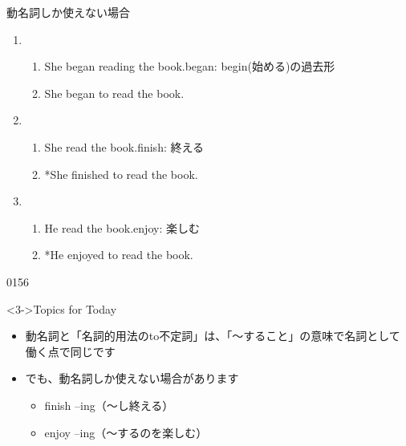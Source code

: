 \documentclass[aspectratio=169,xcolor={dvipsnames,table}]{beamer}
\begin{document}
\begin{frame}[plain]{動名詞しか使えない場合}

 \begin{enumerate}
  \item \begin{enumerate}
	 \item<1-> She began reading the book.\hfill{\scriptsize began: begin(始める)の過去形}
	 \item<2-> She began to read the book.
	\end{enumerate}
  \item \begin{enumerate}
	 \item<4-> She  read the book.\hfill{\scriptsize finish: 終える}
	 \item<5-> *She finished to read the book.
	\end{enumerate}
  \item \begin{enumerate}
	 \item<7-> He  read the book.\hfill{\scriptsize enjoy: 楽しむ}
	 \item<8-> *He enjoyed to read the book.
	\end{enumerate}
 \end{enumerate}
%
\hfill{\tiny 0156}\,{\scriptsize {}}

\begin{block}<3->{Topics for Today}
\begin{itemize}[square]\small
 \item<3->  動名詞と「名詞的用法のto不定詞」は、「〜すること」の意味で名詞として働く点で同じです
 \item<6-> でも、動名詞しか使えない場合があります \dbend
       \begin{itemize}[circle]\small
	\item<6-> finish --ing（〜し終える）\hfill{}\hspace{80pt}\mbox{}
	\item<9-> enjoy --ing（〜するのを楽しむ）\hfill{}\hspace{80pt}\mbox{}
       \end{itemize}
 \end{itemize}
     \end{block}
\end{frame}
\end{document}
